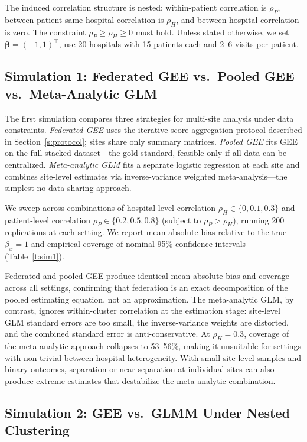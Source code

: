 \documentclass[useAMS,referee]{biom}
\begin{document}
The induced correlation structure is nested: within-patient correlation is $\rho_P$, between-patient same-hospital correlation is $\rho_H$, and between-hospital correlation is zero. The constraint $\rho_P \geq \rho_H \geq 0$ must hold. Unless stated otherwise, we set $\boldsymbol{\beta} = (-1, 1)^{\top}$, use 20 hospitals with 15 patients each and 2--6 visits per patient.


\subsection{Simulation 1: Federated GEE vs.\ Pooled GEE vs.\ Meta-Analytic GLM}
\label{s:sim1}
The first simulation compares three strategies for multi-site analysis under data constraints. \emph{Federated GEE} uses the iterative score-aggregation protocol described in Section~\ref{s:protocol}; sites share only summary matrices. \emph{Pooled GEE} fits GEE on the full stacked dataset---the gold standard, feasible only if all data can be centralized. \emph{Meta-analytic GLM} fits a separate logistic regression at each site and combines site-level estimates via inverse-variance weighted meta-analysis---the simplest no-data-sharing approach.

We sweep across combinations of hospital-level correlation $\rho_H \in \{0, 0.1, 0.3\}$ and patient-level correlation $\rho_P \in \{0.2, 0.5, 0.8\}$ (subject to $\rho_P > \rho_H$), running 200 replications at each setting. We report mean absolute bias relative to the true $\beta_x = 1$ and empirical coverage of nominal 95\% confidence intervals (Table~\ref{t:sim1}).

Federated and pooled GEE produce identical mean absolute bias and coverage across all settings, confirming that federation is an exact decomposition of the pooled estimating equation, not an approximation. The meta-analytic GLM, by contrast, ignores within-cluster correlation at the estimation stage: site-level GLM standard errors are too small, the inverse-variance weights are distorted, and the combined standard error is anti-conservative. At $\rho_H = 0.3$, coverage of the meta-analytic approach collapses to 53--56\%, making it unsuitable for settings with non-trivial between-hospital heterogeneity. With small site-level samples and binary outcomes, separation or near-separation at individual sites can also produce extreme estimates that destabilize the meta-analytic combination.


\subsection{Simulation 2: GEE vs.\ GLMM Under Nested Clustering}
\label{s:sim2}
\end{document}
